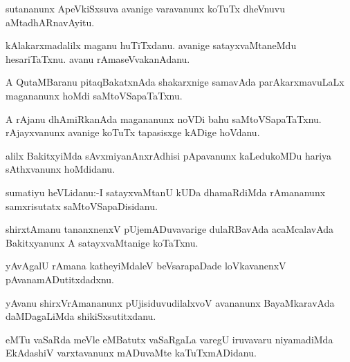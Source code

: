 \documentclass{article}
\begin{document}
\begin{mn}%
sutananunx ApeVkiSxsuva avanige varavanunx koTuTx dheVnuvu aMtadhARnavAyitu.
\end{mn}

\begin{mn}%
kAlakarxmadalilx maganu huTiTxdanu. avanige satayxvaMtaneMdu hesariTaTxnu. avanu 
rAmaseVvakanAdanu.
\end{mn}

\begin{mn}%
A QutaMBaranu pitaqBakatxnAda shakarxnige samavAda parAkarxmavuLaLx magananunx hoMdi 
saMtoVSapaTaTxnu.
\end{mn}

\begin{mn}%
A rAjanu dhAmiRkanAda magananunx noVDi bahu saMtoVSapaTaTxnu. rAjayxvanunx avanige koTuTx
tapasisxge kADige hoVdanu.
\end{mn}

\begin{mn}%
alilx BakitxyiMda sAvxmiyanAnxrAdhisi pApavanunx kaLedukoMDu hariya sAthxvanunx hoMdidanu.
\end{mn}


\begin{mn}%
sumatiyu heVLidanu:-I satayxvaMtanU kUDa dhamaRdiMda rAmananunx samxrisutatx 
saMtoVSapaDisidanu.
\end{mn}

\begin{mn}%
shirxtAmanu tananxnenxV pUjemADuvavarige dulaRBavAda acaMcalavAda Bakitxyanunx A 
satayxvaMtanige koTaTxnu.
\end{mn}

\begin{mn}%
yAvAgalU rAmana katheyiMdaleV beVsarapaDade loVkavanenxV pAvanamADutitxdadxnu.
\end{mn}

\begin{mn}%
yAvanu shirxVrAmananunx pUjisiduvudilalxvoV avananunx BayaMkaravAda daMDagaLiMda 
shikiSxsutitxdanu.
\end{mn}

\begin{mn}%
eMTu vaSaRda meVle eMBatutx vaSaRgaLa varegU iruvavaru niyamadiMda EkAdashiV varxtavanunx 
mADuvaMte kaTuTxmADidanu.
\end{mn}
\end{document}
